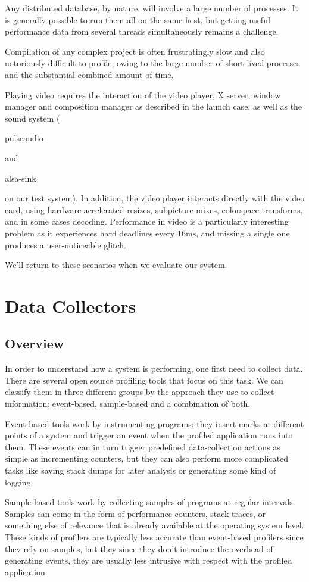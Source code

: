 \documentclass[10pt]{article}
\begin{document}
Any distributed database, by nature, will involve a large number of processes.
It is generally possible to run them all on the same host, but getting useful
performance data from several threads simultaneously remains a challenge.

Compilation of any complex project is often frustratingly slow and also
notoriously difficult to profile, owing to the large number of short-lived
processes and the substantial combined amount of time.

Playing video requires the interaction of the video player, X server, window
manager and composition manager as described in the launch case, as well as the
sound system (\begin{tt}pulseaudio\end{tt} and \begin{tt}alsa-sink\end{tt} on
our test system). In addition, the video player interacts directly with the
video card, using hardware-accelerated resizes, subpicture mixes, colorspace
transforms, and in some cases decoding. Performance in video is a
particularly interesting problem as it experiences hard deadlines every 16ms,
and missing a single one produces a user-noticeable glitch.

We'll return to these scenarios when we evaluate our system.

\section{Data Collectors}
\subsection{Overview}
In order to understand how a system is performing, one first need to collect data. There are several open source profiling tools that focus on this task. We can classify them in three different groups by the approach they use to collect information: event-based, sample-based and a combination of both. 

Event-based tools work by instrumenting programs: they insert marks at different points of a system and trigger an event when the profiled application runs into them. These events can in turn trigger predefined data-collection actions as simple as incrementing counters, but they can also perform more complicated tasks like saving stack dumps for later analysis or generating some kind of logging.

Sample-based tools work by collecting samples of programs at regular intervals.  Samples can come in the form of performance counters, stack traces, or something else of relevance that is already available at the operating system level. These kinds of profilers are typically less accurate than event-based profilers since they rely on samples, but they since they don't introduce the overhead of generating events, they are usually less intrusive with respect with the profiled application.
\end{document}
